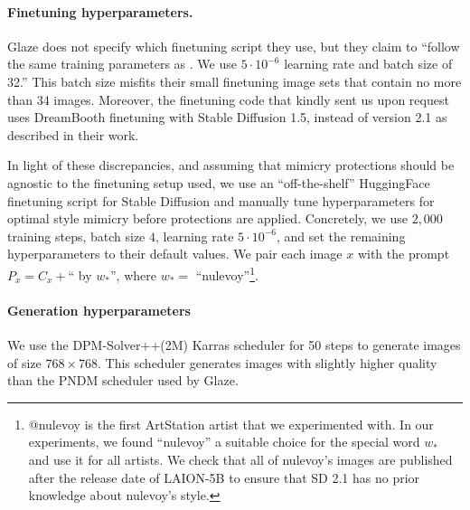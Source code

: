 \documentclass{article}
\newcommand{\word}[1]{#1_*}
\begin{document}
\paragraph{Finetuning hyperparameters.} Glaze does not specify which finetuning script they use, but they claim to ``follow the same training parameters as \citep{stablediffusion}. We use $5\cdot10^{-6}$ learning rate and batch size of 32.'' This batch size misfits their small finetuning image sets that contain no more than 34 images. Moreover, the finetuning code that \citeauthor{glaze} kindly sent us upon request
uses DreamBooth finetuning with Stable Diffusion 1.5, instead of version 2.1 as described in their work.

In light of these discrepancies, and assuming that mimicry protections should be agnostic to the finetuning setup used, we use an ``off-the-shelf'' HuggingFace finetuning script for Stable Diffusion \citep{diffusers} and manually tune hyperparameters for optimal style mimicry before protections are applied. Concretely, we use $2{,}000$ training steps, batch size $4$, learning rate $5\cdot10^{-6}$, and set the remaining hyperparameters to their default values. We pair each image $x$ with the prompt
$P_x = C_x +$`` by $\word{w}$'', where $\word{w} =$ ``nulevoy''\footnote{@nulevoy is the first ArtStation artist that we experimented with. In our experiments, we found ``nulevoy'' a suitable choice for the special word $\word{w}$ and use it for all artists. We check that all of nulevoy's images are published after
the release date of LAION-5B to ensure that SD 2.1 has no prior knowledge about nulevoy's style.}.

\paragraph{Generation hyperparameters} We use the DPM-Solver++(2M) 
 Karras \citep{dpmpp, karras} scheduler for 50 steps to generate images
 of size $768 \times 768$. This scheduler generates images with slightly higher quality than the PNDM \citep{pndm} scheduler used by Glaze.
\end{document}
